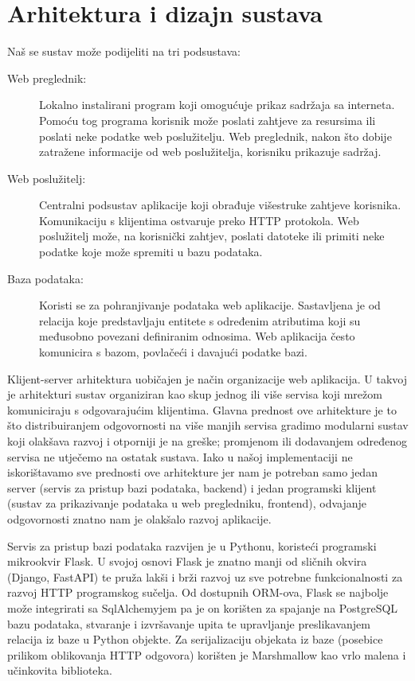 \chapter{Arhitektura i dizajn sustava}

\noindent
Naš se sustav može podijeliti na tri podsustava:
\begin{description}
	\item[Web preglednik:] Lokalno instalirani program koji omogućuje prikaz sadržaja sa interneta. 
	Pomoću tog programa korisnik može poslati zahtjeve za 
	resursima ili poslati neke podatke web poslužitelju. Web preglednik, 
	nakon što dobije zatražene informacije od web poslužitelja, korisniku prikazuje sadržaj.

	\item[Web poslužitelj:] Centralni podsustav aplikacije koji obrađuje višestruke zahtjeve korisnika. Komunikaciju s klijentima ostvaruje preko
	HTTP protokola. Web poslužitelj može, na korisnički zahtjev, poslati datoteke ili primiti
	neke podatke koje može spremiti u bazu podataka.

	\item[Baza podataka:] Koristi se za pohranjivanje podataka web aplikacije. Sastavljena je od relacija koje
	predstavljaju entitete s određenim atributima koji su međusobno povezani definiranim
	odnosima. Web aplikacija često komunicira s bazom, povlačeći i davajući podatke bazi.
\end{description}

Klijent-server arhitektura uobičajen je način organizacije web aplikacija. U takvoj je arhitekturi sustav organiziran kao skup jednog ili više servisa koji mrežom komuniciraju s odgovarajućim klijentima. Glavna prednost ove arhitekture je to što distribuiranjem odgovornosti na više manjih servisa gradimo modularni sustav koji olakšava razvoj i otporniji je na greške; promjenom ili dodavanjem određenog servisa ne utječemo na ostatak sustava. Iako u našoj implementaciji ne iskorištavamo sve prednosti ove arhitekture jer nam je potreban samo jedan server (servis za pristup bazi podataka, backend) i jedan programski klijent (sustav za prikazivanje podataka u web pregledniku, frontend), odvajanje odgovornosti znatno nam je olakšalo razvoj aplikacije.

Servis za pristup bazi podataka razvijen je u Pythonu, koristeći programski mikrookvir Flask. U svojoj osnovi Flask je znatno manji od sličnih okvira (Django, FastAPI) te pruža lakši i brži razvoj uz sve potrebne funkcionalnosti za razvoj HTTP programskog sučelja. Od dostupnih ORM-ova, Flask se najbolje može integrirati sa SqlAlchemyjem pa je on korišten za spajanje na PostgreSQL bazu podataka, stvaranje i izvršavanje upita te upravljanje preslikavanjem relacija iz baze u Python objekte. Za serijalizaciju objekata iz baze (posebice prilikom oblikovanja HTTP odgovora) korišten je Marshmallow kao vrlo malena i učinkovita biblioteka.

